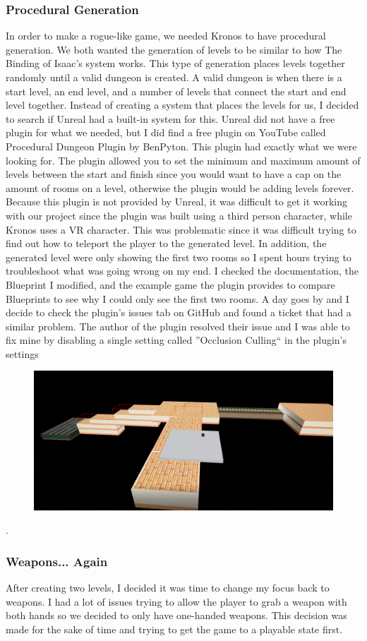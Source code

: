 \documentclass{sigchi}
\begin{document}
\subsubsection*{Procedural Generation}
In order to make a rogue-like game, we needed Kronos to have procedural generation. We both wanted the generation of levels to be similar to how The Binding of Isaac's system works. This type of generation places levels together randomly until a valid dungeon is created. A valid dungeon is when there is a start level, an end level, and a number of levels that connect the start and end level together. Instead of creating a system that places the levels for us, I decided to search if Unreal had a built-in system for this. Unreal did not have a free plugin for what we needed, but I did find a free plugin on YouTube called Procedural Dungeon Plugin by BenPyton. This plugin had exactly what we were looking for. The plugin allowed you to set the minimum and maximum amount of levels between the start and finish since you would want to have a cap on the amount of rooms on a level, otherwise the plugin would be adding levels forever. Because this plugin is not provided by Unreal, it was difficult to get it working with our project since the plugin was built using a third person character, while Kronos uses a VR character. This was problematic since it was difficult trying to find out how to teleport the player to the generated level. In addition, the generated level were only showing the first two rooms so I spent hours trying to troubleshoot what was going wrong on my end. I checked the documentation, the Blueprint I modified, and the example game the plugin provides to compare Blueprints to see why I could only see the first two rooms. A day goes by and I decide to check the plugin's issues tab on GitHub and found a ticket that had a similar problem. The author of the plugin resolved their issue and I was able to fix mine by disabling a single setting called ''Occlusion Culling`` in the plugin's settings
\begin{figure}
	\centering
	\includegraphics[scale=0.12]{dungeon.png}
\end{figure}
.\subsubsection*{Weapons... Again}
After creating two levels, I decided it was time to change my focus back to weapons. I had a lot of issues trying to allow the player to grab a weapon with both hands so we decided to only have one-handed weapons. This decision was made for the sake of time and trying to get the game to a playable state first.
\end{document}
